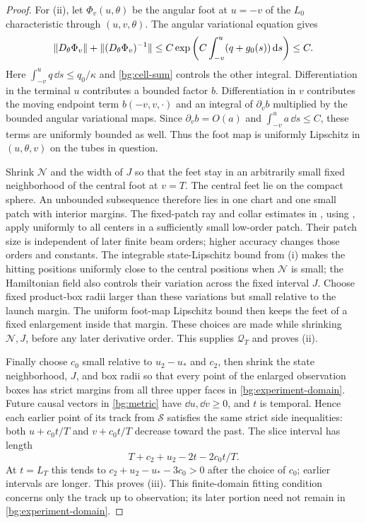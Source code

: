 \begin{proof}
For \textup{(ii)}, let $\Phi_v(u,\theta)$ be the angular foot
at $u=-v$ of the $L_0$ characteristic through $(u,v,\theta)$.
The angular variational equation gives
\begin{equation}\label{bg:foot-jacobian}
 \lVert D_\theta\Phi_v\rVert+
 \lVert(D_\theta\Phi_v)^{-1}\rVert
 \le C\exp\left(C\int_{-v}^{u}(q+g_0(s))\,\mathrm d s\right)
 \le C.
\end{equation}
Here $\int_{-v}^{u}q\,\dd s\le q_0/\kappa$ and
\eqref{bg:cell-sum} controls the other integral. Differentiation
in the terminal $u$ contributes a bounded factor $b$.
Differentiation in $v$ contributes the moving endpoint term
$b(-v,v,\cdot)$ and an integral of $\partial_vb$ multiplied
by the bounded angular variational maps. Since
$\partial_vb=O(a)$ and $\int_{-v}^{u}a\,\dd s\le C$,
these terms are uniformly bounded as well. Thus the foot map
is uniformly Lipschitz in $(u,\theta,v)$ on the tubes in
question.

Shrink $\mathcal N$ and the width of $J$ so that the feet stay in an
arbitrarily small fixed neighborhood of the central foot at
$v=T$. The central feet lie on the compact sphere. An
unbounded subsequence therefore lies in one chart and one
small patch with interior margins. The fixed-patch ray and
collar estimates in \cite[, ]{KerrCOne}, using
\cite[, ]{KerrCTwo}, apply uniformly to all
centers in a sufficiently small low-order patch. Their patch
size is independent of later finite beam orders; higher
accuracy changes those orders and constants. The integrable
state-Lipschitz bound from \textup{(i)} makes the hitting positions
uniformly close to the central positions when $\mathcal N$ is small; the
Hamiltonian field also controls their variation across the fixed
interval $J$. Choose fixed product-box radii larger than these
variations but small relative to the launch margin. The uniform
foot-map Lipschitz bound then keeps the feet of a fixed enlargement
inside that margin. These choices are made while shrinking $\mathcal N,J$,
before any later derivative order. This supplies $\mathcal Q_T$ and proves
\textup{(ii)}.

Finally choose $c_0$ small relative to $u_2-u_*$ and $c_2$,
then shrink the state neighborhood, $J$, and box radii so that every
point of the enlarged observation boxes has strict margins from all three
upper faces in \eqref{bg:experiment-domain}. Future causal
vectors in \eqref{bg:metric} have $\dd u,\dd v\ge0$, and
$t$ is temporal. Hence each earlier point of its track from
$\mathcal S$ satisfies the same strict side inequalities:
both $u+c_0t/T$ and $v+c_0t/T$ decrease toward the past.
The slice interval has length
\[
 T+c_2+u_2-2t-2c_0t/T.
\]
At $t=L_T$ this tends to $c_2+u_2-u_*-3c_0>0$ after the
choice of $c_0$; earlier intervals are longer. This proves
\textup{(iii)}. This finite-domain fitting condition concerns
only the track up to observation; its later portion need not
remain in \eqref{bg:experiment-domain}.
\end{proof}

